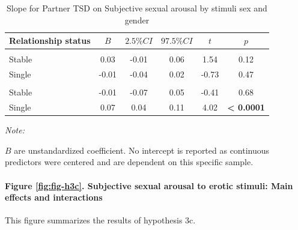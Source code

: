 \documentclass[
  bookmarksnumbered]{article}
\begin{document}
\begin{table}[H]
\centering
\caption{\label{tab:unnamed-chunk-33}Slope for Partner TSD on 
        Subjective sexual arousal by stimuli sex and gender}
\centering
\begin{threeparttable}
\begin{tabular}[t]{lccccc}
\toprule
Relationship status & $B$ & $2.5\% CI$ & $97.5\% CI$ & $t$ & $p$\\
\midrule
\addlinespace[0.3em]
\multicolumn{6}{l}{\cellcolor{lightgray}{Gender: Women}}\\
\hspace{1em}Stable & 0.03 & -0.01 & 0.06 & 1.54 & 0.12\\
\hspace{1em}Single & -0.01 & -0.04 & 0.02 & -0.73 & 0.47\\
\addlinespace[0.3em]
\multicolumn{6}{l}{\cellcolor{lightgray}{Gender: Men}}\\
\hspace{1em}Stable & -0.01 & -0.07 & 0.05 & -0.41 & 0.68\\
\hspace{1em}Single & 0.07 & 0.04 & 0.11 & 4.02 & \textbf{< 0.0001}\\
\bottomrule
\end{tabular}
\begin{tablenotes}[para]
\item \textit{Note: } 
\item $B$ are unstandardized coefficient.
           No intercept is reported as continuous predictors were centered
           and are dependent on this specific sample.
\end{tablenotes}
\end{threeparttable}
\end{table}

\paragraph{Figure \ref{fig:fig-h3c}. Subjective sexual arousal to erotic stimuli: Main effects and interactions}\label{figure-reffigfig-h3c.-subjective-sexual-arousal-to-erotic-stimuli-main-effects-and-interactions}

This figure summarizes the results of hypothesis 3c.
\end{document}
